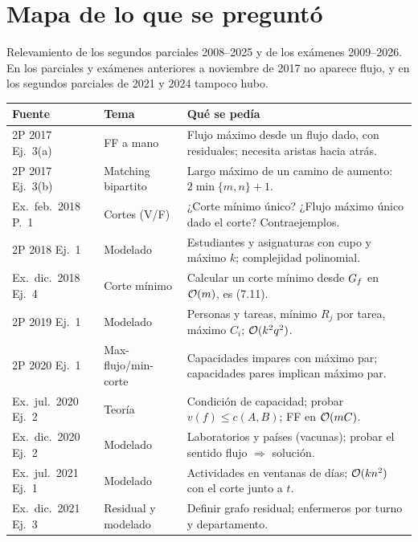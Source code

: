 \section{Mapa de lo que se preguntó}

Relevamiento de los segundos parciales 2008--2025 y de los exámenes 2009--2026. En los parciales y exámenes anteriores a noviembre de 2017 no aparece flujo, y en los segundos parciales de 2021 y 2024 tampoco hubo.

\begin{center}
\small
\begin{tabularx}{\textwidth}{@{}>{\raggedright\arraybackslash}p{2.75cm}>{\raggedright\arraybackslash}p{2.5cm}>{\raggedright\arraybackslash}X@{}}
\toprule
Fuente & Tema & Qué se pedía \\
\midrule
2P 2017 Ej.~3(a) & FF a mano & Flujo máximo desde un flujo dado, con residuales; necesita aristas hacia atrás. \\
2P 2017 Ej.~3(b) & Matching bipartito & Largo máximo de un camino de aumento: $2\min\{m,n\}+1$. \\
Ex.\ feb.~2018 P.~1 & Cortes (V/F) & ¿Corte mínimo único? ¿Flujo máximo único dado el corte? Contraejemplos. \\
2P 2018 Ej.~1 & Modelado & Estudiantes y asignaturas con cupo y máximo $k$; complejidad polinomial. \\
Ex.\ dic.~2018 Ej.~4 & Corte mínimo & Calcular un corte mínimo desde $G_f$ en $\mathcal{O}(m)$, es (7.11). \\
2P 2019 Ej.~1 & Modelado & Personas y tareas, mínimo $R_j$ por tarea, máximo $C_i$; $\mathcal{O}(k^2q^2)$. \\
2P 2020 Ej.~1 & Max-flujo/min-corte & Capacidades impares con máximo par; capacidades pares implican máximo par. \\
Ex.\ jul.~2020 Ej.~2 & Teoría & Condición de capacidad; probar $v(f)\le c(A,B)$; FF en $\mathcal{O}(mC)$. \\
Ex.\ dic.~2020 Ej.~2 & Modelado & Laboratorios y países (vacunas); probar el sentido flujo $\Rightarrow$ solución. \\
Ex.\ jul.~2021 Ej.~1 & Modelado & Actividades en ventanas de días; $\mathcal{O}(kn^2)$ con el corte junto a $t$. \\
Ex.\ dic.~2021 Ej.~3 & Residual y modelado & Definir grafo residual; enfermeros por turno y departamento. \\
\bottomrule
\end{tabularx}
\end{center}

